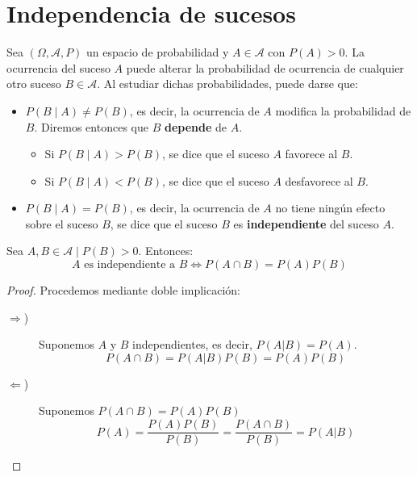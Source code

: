 \section{Independencia de sucesos}
Sea $(\Omega, \mathcal{A}, P)$ un espacio de probabilidad y $A \in \mathcal{A}$ con $P(A)>0$. La ocurrencia del suceso $A$ puede alterar la probabilidad de ocurrencia de cualquier otro suceso $B \in \mathcal{A}$.
Al estudiar dichas probabilidades, puede darse que:
\begin{itemize}
  \item $P(B \mid A) \neq P(B)$, es decir, la ocurrencia de $A$ modifica la probabilidad de $B$. Diremos
        entonces que $B$ \textbf{depende} de $A$.
        \begin{itemize}
          \item Si $P(B \mid A)>P(B)$, se dice que el suceso $A$ favorece al $B$.
          \item Si $P(B \mid A)<P(B)$, se dice que el suceso $A$ desfavorece al $B$.
        \end{itemize}
  \item $P(B \mid A) = P(B)$, es decir, la ocurrencia de $A$ no tiene ningún efecto sobre el suceso
        $B$, se dice que el suceso $B$ es \textbf{independiente} del suceso $A$.
\end{itemize}

\begin{teo}  Sea $A,B\in \mathcal{A}\mid P(B)>0$. Entonces:
\begin{equation*}
    \text{$A$ es independiente a $B$} \Longleftrightarrow P(A\cap B) = P(A)P(B)
\end{equation*}
\end{teo}
\begin{proof} Procedemos mediante doble implicación:
\begin{description}
    \item [$\Longrightarrow $)] Suponemos $A$ y $B$ independientes, es decir, $P(A|B)=P(A)$.
    \begin{equation*}
        P(A\cap B) = P(A|B)P(B) = P(A)P(B)
    \end{equation*}

    \item [$\Longleftarrow $)] Suponemos $P(A\cap B)=P(A)P(B)$
    \begin{equation*}
        P(A)=\frac{P(A)P(B)}{P(B)} = \frac{P(A\cap B)}{P(B)} = P(A|B)
    \end{equation*}
\end{description}
\end{proof}

